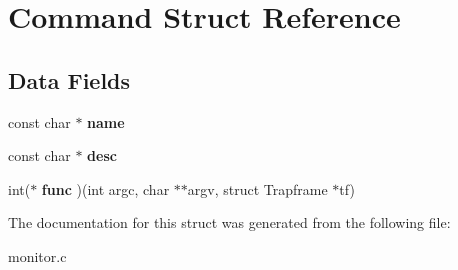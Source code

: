 \hypertarget{structCommand}{}\section{Command Struct Reference}
\label{structCommand}
\subsection*{Data Fields}
\begin{DoxyCompactItemize}
\item 
const char $\ast$ {\bfseries name}\hypertarget{structCommand_aaac7db0461198bc84c6bb01e64ae82e3}{}\label{structCommand_aaac7db0461198bc84c6bb01e64ae82e3}

\item 
const char $\ast$ {\bfseries desc}\hypertarget{structCommand_a8b1a2161af48dfcc3f8abac9d1b922fe}{}\label{structCommand_a8b1a2161af48dfcc3f8abac9d1b922fe}

\item 
int($\ast$ {\bfseries func} )(int argc, char $\ast$$\ast$argv, struct Trapframe $\ast$tf)\hypertarget{structCommand_a37d451748878a78372ce5764e6d38081}{}\label{structCommand_a37d451748878a78372ce5764e6d38081}

\end{DoxyCompactItemize}


The documentation for this struct was generated from the following file\+:\begin{DoxyCompactItemize}
\item 
monitor.\+c\end{DoxyCompactItemize}
